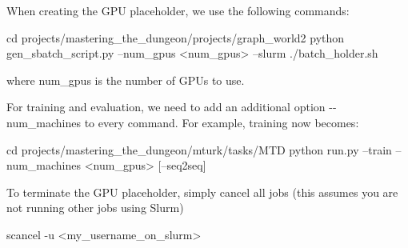When creating the G\+PU placeholder, we use the following commands\+: 
\begin{DoxyCode}
cd projects/mastering\_the\_dungeon/projects/graph\_world2
python gen\_sbatch\_script.py --num\_gpus <num\_gpus> --slurm
./batch\_holder.sh
\end{DoxyCode}
 where {\ttfamily num\+\_\+gpus} is the number of G\+P\+Us to use.

For training and evaluation, we need to add an additional option {\ttfamily -\/-\/num\+\_\+machines} to every command. For example, training now becomes\+: 
\begin{DoxyCode}
cd projects/mastering\_the\_dungeon/mturk/tasks/MTD
python run.py --train --num\_machines <num\_gpus> [--seq2seq]
\end{DoxyCode}


To terminate the G\+PU placeholder, simply cancel all jobs (this assumes you are not running other jobs using Slurm) 
\begin{DoxyCode}
scancel -u <my\_username\_on\_slurm>
\end{DoxyCode}
 